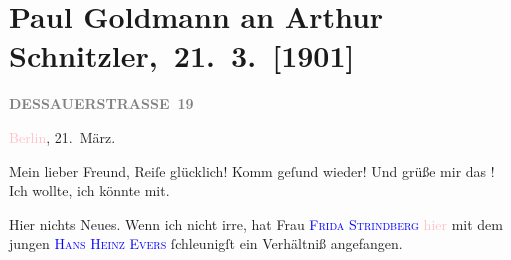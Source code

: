 

\renewcommand{\erwaehntePersonen}{Personen: Hanns Heinz Ewers, Hugo von Hofmannsthal, Dora Michaelis, Olga Schnitzler, Elisabeth Steinrück, Frida Strindberg, Irene Triesch, Jakob Wassermann}
\renewcommand{\erwaehnteOrte}{Orte: Berlin, Dessauer Straße, Grünentorgasse, Italien, Wien}
\renewcommand{\erwaehnteWerke}{Werke: Tagebuch}
\section[ Paul Goldmann an Arthur Schnitzler, 21. 3. {[}1901{]}]{Paul Goldmann an Arthur Schnitzler, 21. 3. {[}1901{]}}
\nopagebreak{}
\rehead{ }\normalsize\beginnumbering{}
\toendnotes[C]{\smallbreak\pagebreak[2]}
\toendnotes[C]{\smallbreak}
\pstart
           \noindent{}\raggedleft{}{\pb}\textcolor{pink}{\textcolor{gray}{\textbf{DESSAUERSTRASSE 19}}}{}\ledrightnote{\textcolor{pink}{Dessauer Straße}}\pend
           
\pstart
           \textcolor{pink}{Berlin}{}\ledrightnote{\textcolor{pink}{Berlin}}, 21. März.\pend
           
\pstart\center{}Mein lieber Freund,\pend
\pstart
           Reiſe glücklich! Komm geſund wieder! Und grüße mir das \label{K_L03062-1v}\label{K_L03062-1h}! Ich wollte, ich könnte mit.\pend
           
\pstart
           Hier nichts Neues. Wenn ich nicht irre, hat Frau \textsc{\textcolor{blue}{Frida Strindberg}{}\ledrightnote{\textcolor{blue}{Frida Strindberg}}}{ }\textcolor{pink}{hier}{}\ledrightnote{{$\rightarrow$}\textcolor{pink}{Berlin}} mit dem jungen \textsc{\textcolor{blue}{Hans Heinz Evers}{}\ledrightnote{\textcolor{blue}{Hanns Heinz Ewers}}} ſchleunigſt ein Verhältniß angefangen.\pend
           
